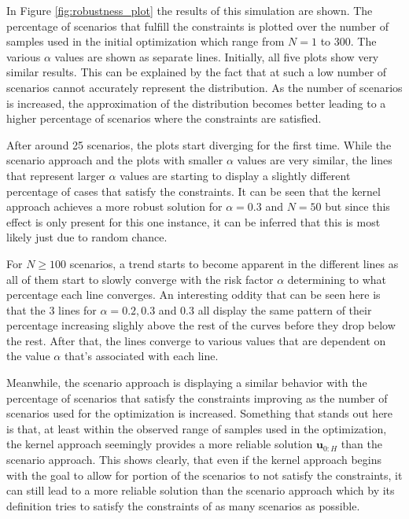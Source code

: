 In Figure \ref{fig:robustness_plot} the results of this simulation are shown. The percentage of scenarios that fulfill the constraints is plotted over the number of samples used in the initial optimization which range from $N = 1$ to 300. The various $\alpha$ values are shown as separate lines. Initially, all five plots show very similar results. This can be explained by the fact that at such a low number of scenarios cannot accurately represent the distribution. As the number of scenarios is increased, the approximation of the distribution becomes better leading to a higher percentage of scenarios where the constraints are satisfied.

After around 25 scenarios, the plots start diverging for the first time. While the scenario approach and the plots with smaller $\alpha$ values are very similar, the lines that represent larger $\alpha$ values are starting to display a slightly different percentage of cases that satisfy the constraints. It can be seen that the kernel approach achieves a more robust solution for $\alpha = 0.3$ and $N = 50$ but since this effect is only present for this one instance, it can be inferred that this is most likely just due to random chance.

For $N \geq 100$ scenarios, a trend starts to become apparent in the different lines as all of them start to slowly converge with the risk factor $\alpha$ determining to what percentage each line converges. An interesting oddity that can be seen here is that the 3 lines for $\alpha = 0.2, 0.3$ and $0.3$ all display the same pattern of their percentage increasing slighly above the rest of the curves before they drop below the rest. After that, the lines converge to various values that are dependent on the value $\alpha$ that's associated with each line.

Meanwhile, the scenario approach is displaying a similar behavior with the percentage of scenarios that satisfy the constraints improving as the number of scenarios used for the optimization is increased. Something that stands out here is that, at least within the observed range of samples used in the optimization, the kernel approach seemingly provides a more reliable solution $\boldsymbol{u}_{0:H}$ than the scenario approach. This shows clearly, that even if the kernel approach begins with the goal to allow for portion of the scenarios to not satisfy the constraints, it can still lead to a more reliable solution than the scenario approach which by its definition tries to satisfy the constraints of as many scenarios as possible.

